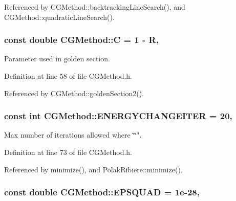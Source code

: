 Referenced by C\+G\+Method\+::backtracking\+Line\+Search(), and C\+G\+Method\+::quadratic\+Line\+Search().

\hypertarget{classCGMethod_af8587ca1c0394c244ce84fe8a6ad29ff}{
\subsubsection[{C}]{\setlength{\rightskip}{0pt plus 5cm}const double C\+G\+Method\+::\+C = 1 -\/ {\bf R}\hspace{0.3cm}{\ttfamily [protected]}, {\ttfamily [inherited]}}}\label{classCGMethod_af8587ca1c0394c244ce84fe8a6ad29ff}


Parameter used in golden section. 



Definition at line 58 of file C\+G\+Method.\+h.



Referenced by C\+G\+Method\+::golden\+Section2().

\hypertarget{classCGMethod_aaee1e11813855cc66c360f7cb3d9665a}{
\subsubsection[{E\+N\+E\+R\+G\+Y\+C\+H\+A\+N\+G\+E\+I\+T\+E\+R}]{\setlength{\rightskip}{0pt plus 5cm}const int C\+G\+Method\+::\+E\+N\+E\+R\+G\+Y\+C\+H\+A\+N\+G\+E\+I\+T\+E\+R = 20\hspace{0.3cm}{\ttfamily [protected]}, {\ttfamily [inherited]}}}\label{classCGMethod_aaee1e11813855cc66c360f7cb3d9665a}


Max number of iterations allowed where \char`\"{}\char`\"{}". 



Definition at line 73 of file C\+G\+Method.\+h.



Referenced by minimize(), and Polak\+Ribiere\+::minimize().

\hypertarget{classCGMethod_adb2a688fe52a8729d703d81e52b9fdb3}{
\subsubsection[{E\+P\+S\+Q\+U\+A\+D}]{\setlength{\rightskip}{0pt plus 5cm}const double C\+G\+Method\+::\+E\+P\+S\+Q\+U\+A\+D = 1e-\/28\hspace{0.3cm}{\ttfamily [protected]}, {\ttfamily [inherited]}}}\label{classCGMethod_adb2a688fe52a8729d703d81e52b9fdb3}



